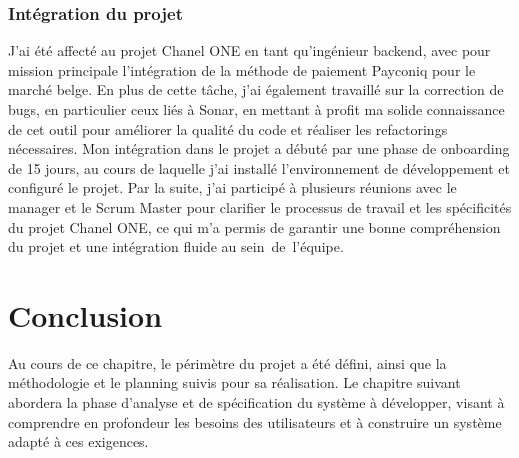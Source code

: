 \subsubsection{Intégration du projet}

J'ai été affecté au projet Chanel ONE en tant qu'ingénieur backend, avec pour mission principale l'intégration de la méthode de paiement Payconiq pour le marché belge. En plus de cette tâche, j'ai également travaillé sur la correction de bugs, en particulier ceux liés à Sonar, en mettant à profit ma solide connaissance de cet outil pour améliorer la qualité du code et réaliser les refactorings nécessaires. Mon intégration dans le projet a débuté par une phase de onboarding de 15 jours, au cours de laquelle j'ai installé l'environnement de développement et configuré le projet. Par la suite, j'ai participé à plusieurs réunions avec le manager et le Scrum Master pour clarifier le processus de travail et les spécificités du projet Chanel ONE, ce qui m'a permis de garantir une bonne compréhension du projet et une intégration fluide au sein de l'équipe.
\section*{Conclusion}
Au cours de ce chapitre, le périmètre du projet a été défini, ainsi que la méthodologie et le planning suivis pour sa réalisation. Le chapitre suivant abordera la phase d’analyse et de spécification du système à développer, visant à comprendre en profondeur les besoins des utilisateurs et à construire un système adapté à ces exigences.







